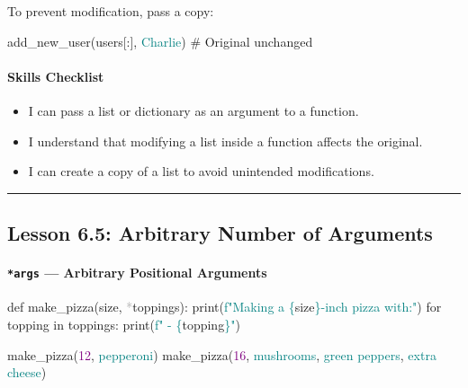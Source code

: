 \documentclass[
  justified,
  openright,
]{tufte-book}
\let\subsubsection\paragraph
\let\paragraph\paragraph
\newcommand{\BuiltInTok}[1]{#1}
\newcommand{\CommentTok}[1]{\textcolor{MidGray}{#1}}
\newcommand{\ControlFlowTok}[1]{\textcolor{BrandBlue}{#1}}
\newcommand{\DecValTok}[1]{\textcolor{Purple}{#1}}
\newcommand{\KeywordTok}[1]{\textcolor{BrandBlue}{#1}}
\newcommand{\NormalTok}[1]{#1}
\newcommand{\OperatorTok}[1]{\textcolor{DarkGray}{#1}}
\newcommand{\SpecialCharTok}[1]{\textcolor{Teal}{#1}}
\newcommand{\SpecialStringTok}[1]{\textcolor{Teal}{#1}}
\newcommand{\StringTok}[1]{\textcolor{Teal}{#1}}
\newenvironment{Shaded}{%
  \begin{snugshade}
}{%
  \end{snugshade}
}
\let\subsubsection\paragraph
\let\paragraph\paragraph
\providecommand{\tightlist}{%
  \setlength{\itemsep}{0pt}\setlength{\parskip}{0pt}}
\begin{document}
To prevent modification, pass a copy:

\begin{Shaded}
\begin{Highlighting}[]
\NormalTok{add\_new\_user(users[:], }\StringTok{\textquotesingle{}Charlie\textquotesingle{}}\NormalTok{)   }\CommentTok{\# Original unchanged}
\end{Highlighting}
\end{Shaded}

\subsubsection{Skills Checklist}\label{skills-checklist-30}

\begin{itemize}
\tightlist
\item[$\square$]
  I can pass a list or dictionary as an argument to a function.
\item[$\square$]
  I understand that modifying a list inside a function affects the
  original.
\item[$\square$]
  I can create a copy of a list to avoid unintended modifications.
\end{itemize}

\begin{center}\rule{0.5\linewidth}{0.5pt}\end{center}

\subsection{Lesson 6.5: Arbitrary Number of
Arguments}\label{lesson-6.5-arbitrary-number-of-arguments}

\subsubsection{\texorpdfstring{\texttt{*args} --- Arbitrary Positional
Arguments}{*args --- Arbitrary Positional Arguments}}\label{args-arbitrary-positional-arguments}

\begin{Shaded}
\begin{Highlighting}[]
\KeywordTok{def}\NormalTok{ make\_pizza(size, }\OperatorTok{*}\NormalTok{toppings):}
    \BuiltInTok{print}\NormalTok{(}\SpecialStringTok{f"Making a }\SpecialCharTok{\{}\NormalTok{size}\SpecialCharTok{\}}\SpecialStringTok{{-}inch pizza with:"}\NormalTok{)}
    \ControlFlowTok{for}\NormalTok{ topping }\KeywordTok{in}\NormalTok{ toppings:}
        \BuiltInTok{print}\NormalTok{(}\SpecialStringTok{f"  {-} }\SpecialCharTok{\{}\NormalTok{topping}\SpecialCharTok{\}}\SpecialStringTok{"}\NormalTok{)}

\NormalTok{make\_pizza(}\DecValTok{12}\NormalTok{, }\StringTok{\textquotesingle{}pepperoni\textquotesingle{}}\NormalTok{)}
\NormalTok{make\_pizza(}\DecValTok{16}\NormalTok{, }\StringTok{\textquotesingle{}mushrooms\textquotesingle{}}\NormalTok{, }\StringTok{\textquotesingle{}green peppers\textquotesingle{}}\NormalTok{, }\StringTok{\textquotesingle{}extra cheese\textquotesingle{}}\NormalTok{)}
\end{Highlighting}
\end{Shaded}
\end{document}
